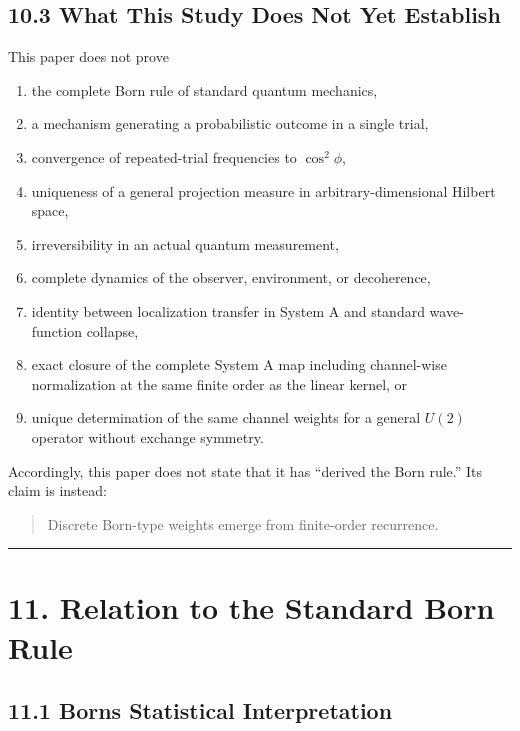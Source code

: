 \documentclass[
  a4paper,
  10pt]{article}
\providecommand{\tightlist}{%
  \setlength{\itemsep}{0pt}\setlength{\parskip}{0pt}}
\begin{document}
\subsection{10.3 What This Study Does Not Yet
Establish}\label{103-what-this-study-does-not-yet-establish}

This paper does not prove

\begin{enumerate}
\def\labelenumi{\arabic{enumi}.}
\tightlist
\item
  the complete Born rule of standard quantum mechanics,
\item
  a mechanism generating a probabilistic outcome in a single trial,
\item
  convergence of repeated-trial frequencies to \(\cos^2\phi\),
\item
  uniqueness of a general projection measure in arbitrary-dimensional
  Hilbert space,
\item
  irreversibility in an actual quantum measurement,
\item
  complete dynamics of the observer, environment, or decoherence,
\item
  identity between localization transfer in System A and standard
  wave-function collapse,
\item
  exact closure of the complete System A map including channel-wise
  normalization at the same finite order as the linear kernel, or
\item
  unique determination of the same channel weights for a general
  \(U(2)\) operator without exchange symmetry.
\end{enumerate}

Accordingly, this paper does not state that it has ``derived the Born
rule.'' Its claim is instead:

\begin{quote}
Discrete Born-type weights emerge from finite-order recurrence.
\end{quote}

\begin{center}\rule{0.5\linewidth}{0.5pt}\end{center}

\section{11. Relation to the Standard Born
Rule}\label{11-relation-to-the-standard-born-rule}

\subsection{11.1 Born\textquotesingle s Statistical
Interpretation}\label{111-borns-statistical-interpretation}
\end{document}
